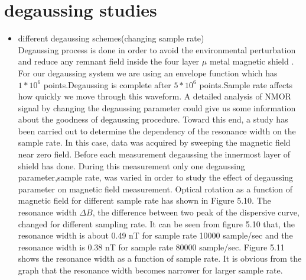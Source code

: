    \section{degaussing studies}  
   \begin{itemize}
   \item different degaussing schemes(changing sample rate)\\
Degaussing process is done in order to avoid the environmental perturbation and reduce any remnant field inside the four layer $\mu$ metal magnetic shield \cite{doi:10.1063/1.2713433}. For our degaussing system we are using an envelope function which has $1*10^6$ points.Degaussing is complete after $5*10^6$ points.Sample rate affects how quickly we move through this waveform. A detailed analysis of NMOR signal by changing the degaussing parameter could give us some information about the goodness of degaussing procedure. Toward this end, a study has been carried out to determine  the dependency of the resonance width on the sample rate. In this case, data was acquired by sweeping the magnetic field near zero field. Before each measurement degaussing the innermost layer of shield has done. During this measurement only one degaussing parameter,sample rate, was varied in order to study the effect of degaussing parameter on magnetic field measurement.  Optical rotation as a function of magnetic field for different sample rate has shown in Figure 5.10. The resonance width $\Delta B$, the difference between two peak of the dispersive curve, changed for different sampling rate. It can be seen from figure 5.10 that, the resonance width is about 0.49 nT for sample rate 10000 sample/sec and the resonance width is 0.38 nT for sample rate 80000 sample/sec. Figure 5.11 shows the resonance width as a function of sample rate. It is obvious from the graph that the resonance width becomes narrower for larger sample rate.    
   

\end{itemize}
